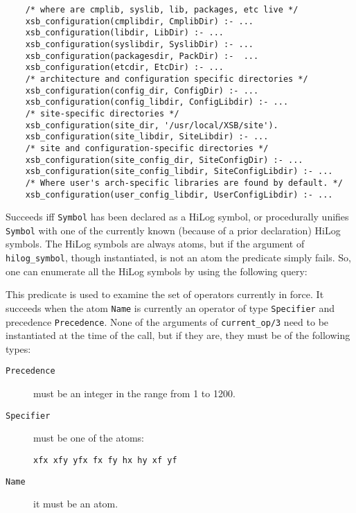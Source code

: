 \begin{description}
{\begin{verbatim}
    /* where are cmplib, syslib, lib, packages, etc live */
    xsb_configuration(cmplibdir, CmplibDir) :- ...
    xsb_configuration(libdir, LibDir) :- ...
    xsb_configuration(syslibdir, SyslibDir) :- ...
    xsb_configuration(packagesdir, PackDir) :-  ...
    xsb_configuration(etcdir, EtcDir) :- ...
    /* architecture and configuration specific directories */
    xsb_configuration(config_dir, ConfigDir) :- ...
    xsb_configuration(config_libdir, ConfigLibdir) :- ...
    /* site-specific directories */
    xsb_configuration(site_dir, '/usr/local/XSB/site').
    xsb_configuration(site_libdir, SiteLibdir) :- ...
    /* site and configuration-specific directories */
    xsb_configuration(site_config_dir, SiteConfigDir) :- ...
    xsb_configuration(site_config_libdir, SiteConfigLibdir) :- ...
    /* Where user's arch-specific libraries are found by default. */
    xsb_configuration(user_config_libdir, UserConfigLibdir) :- ...
\end{verbatim}
}

    Succeeds iff {\tt Symbol} has been declared as a HiLog symbol, or 
    procedurally unifies {\tt Symbol} with one of the currently known 
    (because of a prior declaration) HiLog symbols. The HiLog symbols
    are always atoms, but if the argument of {\tt hilog\_symbol},
    though instantiated, is not an atom the predicate simply fails.
    So, one can enumerate all the HiLog symbols by using the following
    query:


%
    This predicate is used to examine the set of operators currently
    in force.  It succeeds when the atom {\tt Name} is currently an
    operator of type {\tt Specifier} and precedence {\tt Precedence}.  None
    of the arguments of {\tt current\_op/3} need to be instantiated at
    the time of the call, but if they are, they must be of the
    following types: 
\begin{description}
\item[{\tt Precedence}] must be an integer in the range from 1 to 1200.  
\item[{\tt Specifier}] must be one of the atoms: 
\begin{verbatim} 
xfx xfy yfx fx fy hx hy xf yf 
\end{verbatim} 
\item[{\tt Name}] it must be an atom.
\end{description}


\end{description}
